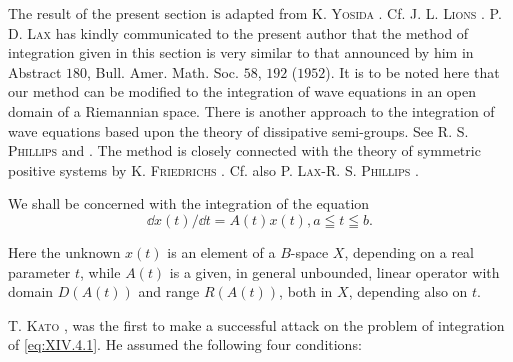 \begin{remarku} The result of the present section is adapted from K. \textsc{Yosida} \cite{yosida365}. Cf. J. L. \textsc{Lions} \cite{liggett178}. P. D. \textsc{Lax} has kindly communicated to the present author that the method of integration given in this section is very similar to that announced by him in Abstract $180$, Bull. Amer. Math. Soc. $58$, $192$ ($1952$). It is to be noted here that our method can be modified to the integration of wave equations in an open domain of a Riemannian space. There is another approach to the integration of wave equations based upon the theory of dissipative semi-groups. See R. S. \textsc{Phillips} \cite{phillips258} and \cite{phillips259}. The method is closely connected with the theory of symmetric positive systems by K. \textsc{Friedrichs} \cite{friedrichs70}. Cf. also P. \textsc{Lax}-R. S. \textsc{Phillips} \cite{lewy173}. 
\end{remarku}


\label{sec:XIV.4}

We shall be concerned with the integration of the equation 
\begin{equation}\label{eq:XIV.4.1}
\dd x (t) / \dd t = A (t) x (t), a \leqq t \leqq b.
\end{equation}

Here the unknown $x(t)$ is an element of a $B$-space $X$, depending on a real parameter $t$, while $A(t)$ is a given, in general unbounded, linear operator with domain $D(A(t))$ and range $R(A(t))$, both in $X$, depending also on $t$. 

T. \textsc{Kato} \cite{kato136}, \cite{kato137} was the first to make a successful attack on the problem of integration of \eqref{eq:XIV.4.1}. He assumed the following four conditions: 

